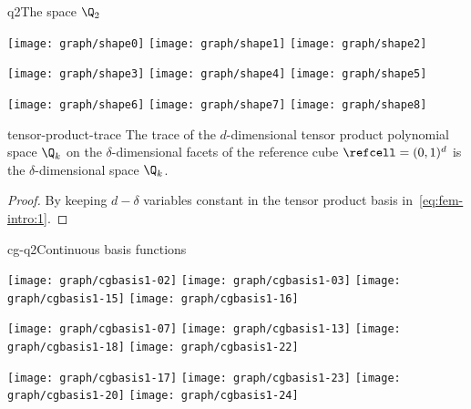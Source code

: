 \begin{Example*}{q2}{The space $\Q_2$}
    \begin{center}
    \texttt{[image: graph/shape0]}
    \texttt{[image: graph/shape1]}
    \texttt{[image: graph/shape2]}

    \texttt{[image: graph/shape3]}
    \texttt{[image: graph/shape4]}
    \texttt{[image: graph/shape5]}

    \texttt{[image: graph/shape6]}
    \texttt{[image: graph/shape7]}
    \texttt{[image: graph/shape8]}
  \end{center}
\end{Example*}


\begin{Lemma}{tensor-product-trace}
  The trace of the $d$-dimensional tensor product polynomial space
  $\Q_k$ on the $\delta$-dimensional facets of the reference cube
  $\refcell = (0,1)^d$ is the $\delta$-dimensional space $\Q_k$.

\end{Lemma}

\begin{proof}
  By keeping $d-\delta$ variables constant in the tensor product basis
  in~\eqref{eq:fem-intro:1}.
\end{proof}

\begin{Example*}{cg-q2}{Continuous basis functions}
  \begin{center}
    \texttt{[image: graph/cgbasis1-02]}
    \texttt{[image: graph/cgbasis1-03]}
    \texttt{[image: graph/cgbasis1-15]}
    \texttt{[image: graph/cgbasis1-16]}

    \texttt{[image: graph/cgbasis1-07]}
    \texttt{[image: graph/cgbasis1-13]}
    \texttt{[image: graph/cgbasis1-18]}
    \texttt{[image: graph/cgbasis1-22]}

    \texttt{[image: graph/cgbasis1-17]}
    \texttt{[image: graph/cgbasis1-23]}
    \texttt{[image: graph/cgbasis1-20]}
    \texttt{[image: graph/cgbasis1-24]}
  \end{center}
\end{Example*}



